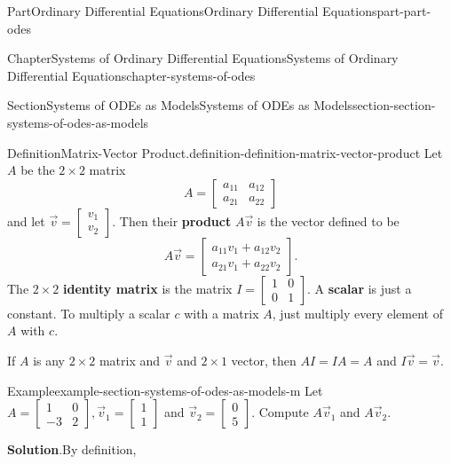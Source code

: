 \documentclass[twoside,10pt,]{book}
\newcommand{\blocktitlefont}{\relax}
\newcommand{\terminology}[1]{\textbf{#1}}
\numberwithin{equation}{part}
\begin{document}
\begin{partptx}{Part}{Ordinary Differential Equations}{}{Ordinary Differential Equations}{}{}{part-part-odes}
\begin{chapterptx}{Chapter}{Systems of Ordinary Differential Equations}{}{Systems of Ordinary Differential Equations}{}{}{chapter-systems-of-odes}
\begin{sectionptx}{Section}{Systems of ODEs as Models}{}{Systems of ODEs as Models}{}{}{section-section-systems-of-odes-as-models}
\begin{definition}{Definition}{Matrix-Vector Product.}{definition-definition-matrix-vector-product}%
Let \(A\) be the \(2\times 2\) matrix%
\begin{equation*}
A = \begin{bmatrix} a_{11}& a_{12}\\a_{21}& a_{22} \end{bmatrix}
\end{equation*}
and let \(\vec{v} = \begin{bmatrix} v_{1}\\v_{2} \end{bmatrix}\). Then their \terminology{product} \(A\vec{v}\) is the vector defined to be%
\begin{equation*}
A\vec{v} = \begin{bmatrix} a_{11}v_{1}+a_{12}v_{2}\\a_{21}v_{1}+a_{22}v_{2} \end{bmatrix}.
\end{equation*}
The \(2\times 2\) \terminology{identity matrix} is the matrix \(I = \begin{bmatrix}1&0\\0&1\end{bmatrix}\). A \terminology{scalar} is just a constant. To multiply a scalar \(c\) with a matrix \(A\), just multiply every element of \(A\) with \(c\).%
\end{definition}
If \(A\) is any \(2\times2\) matrix and \(\vec{v}\) and \(2\times1\) vector, then \(AI=IA=A\) and \(I\vec{v} = \vec{v}\).%
\begin{example}{Example}{}{example-section-systems-of-odes-as-models-m}%
Let \(A = \begin{bmatrix} 1&0\\-3&2 \end{bmatrix},\vec{v}_{1} = \begin{bmatrix}1\\1\end{bmatrix}\) and \(\vec{v}_{2} = \begin{bmatrix}0\\5\end{bmatrix}\). Compute \(A\vec{v}_{1}\) and \(A\vec{v}_{2}\).%
\par\smallskip%
\noindent\textbf{\blocktitlefont Solution}.\hypertarget{solution-section-systems-of-odes-as-models-m-b}{}\quad{}By definition,%
\begin{equation*}

\end{equation*}
\end{example}
\end{sectionptx}
\end{chapterptx}
\end{partptx}
\end{document}
